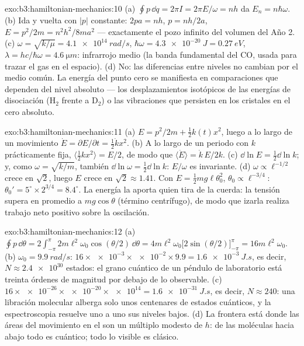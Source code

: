 \begin{solution}{exo:b3:hamiltonian-mechanics:10}
(a) $\oint p\,\dd q = 2\pi I = 2\pi E/\omega = nh$ da $E_n =
n\hbar\omega$. (b) Ida y vuelta con $|p|$ constante: $2pa = nh$, $p =
nh/2a$, $E = p^2/2m = n^2h^2/8ma^2$ --- exactamente el pozo infinito del
volumen del Año 2. (c) $\omega = \sqrt{k/\mu} = \qty{4.1e14}{rad/s}$,
$\hbar\omega = \qty{4.3e-20}{J} = \qty{0.27}{eV}$, $\lambda = hc/
\hbar\omega = \qty{4.6}{\micro m}$: infrarrojo medio (la banda fundamental
del CO, usada para trazar el gas en el espacio). (d) No: las diferencias
entre niveles no cambian por el medio común. La energía del punto cero se
manifiesta en comparaciones que dependen del nivel absoluto --- los
desplazamientos isotópicos de las energías de disociación (H$_2$ frente a
D$_2$) o las vibraciones que persisten en los cristales en el cero absoluto.
\end{solution}

\begin{solution}{exo:b3:hamiltonian-mechanics:11}
(a) $E = p^2/2m + \tfrac12 k(t)x^2$, luego a lo largo de un movimiento $\dot E =
\partial E/\partial t = \tfrac12\dot kx^2$. (b) A lo largo de un periodo con
$k$ prácticamente fija, $\langle\tfrac12 kx^2\rangle = E/2$, de modo que
$\langle\dot E\rangle = \dot k\,E/2k$. (c) $\dd\ln E = \tfrac12\dd\ln
k$; y, como $\omega = \sqrt{k/m}$, también $\dd\ln\omega = \tfrac12\dd\ln k$:
$E/\omega$ es invariante. (d) $\omega \propto \ell^{-1/2}$ crece
en $\sqrt2$, luego $E$ crece en $\sqrt2 \approx 1.41$. Con $E = \tfrac12
mg\ell\theta_0^2$, $\theta_0 \propto \ell^{-3/4}$: $\theta_0' =
5^\circ \times 2^{3/4} = 8.4^\circ$. La energía la aporta quien tira de la
cuerda: la tensión supera en promedio a $mg\cos\theta$ (término
centrífugo), de modo que izarla realiza trabajo neto positivo sobre la
oscilación.
\end{solution}

\begin{solution}{exo:b3:hamiltonian-mechanics:12}
(a) $\oint p\,\dd\theta = 2\int_{-\pi}^{\pi}2m\ell^2\omega_0
\cos(\theta/2)\,\dd\theta = 4m\ell^2\omega_0\big[2\sin(\theta/2)
\big]_{-\pi}^{\pi} = 16m\ell^2\omega_0$. (b) $\omega_0 =
\qty{9.9}{rad/s}$: $16 \times \num{e-3} \times \num{e-2} \times 9.9 =
\qty{1.6e-3}{J.s}$, es decir, $N \approx \num{2.4e30}$ estados: el grano
cuántico de un péndulo de laboratorio está treinta órdenes de magnitud por
debajo de lo observable. (c) $16 \times \num{e-26} \times
\num{e-20} \times \num{e14} = \qty{1.6e-31}{J.s}$, es decir, $N \approx
240$: una libración molecular alberga solo unos centenares de estados
cuánticos, y la espectroscopia resuelve uno a uno sus niveles bajos. (d) La
frontera está donde las áreas del movimiento en el  son un
múltiplo modesto de $h$: de las moléculas hacia abajo todo es cuántico;
todo lo visible es clásico.
\end{solution}


